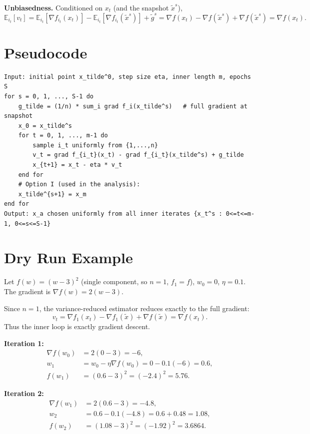 \documentclass[11pt]{article}
\begin{document}
\textbf{Unbiasedness.} Conditioned on $x_t$ (and the snapshot $\tilde{x}^s$),
\[
\mathbb{E}_{i_t}[v_t]
= \mathbb{E}_{i_t}[\nabla f_{i_t}(x_t)] - \mathbb{E}_{i_t}[\nabla f_{i_t}(\tilde{x}^s)] + \tilde{g}^s
= \nabla f(x_t) - \nabla f(\tilde{x}^s) + \nabla f(\tilde{x}^s) = \nabla f(x_t).
\]

\section*{Pseudocode}

\begin{verbatim}
Input: initial point x_tilde^0, step size eta, inner length m, epochs S
for s = 0, 1, ..., S-1 do
    g_tilde = (1/n) * sum_i grad f_i(x_tilde^s)   # full gradient at snapshot
    x_0 = x_tilde^s
    for t = 0, 1, ..., m-1 do
        sample i_t uniformly from {1,...,n}
        v_t = grad f_{i_t}(x_t) - grad f_{i_t}(x_tilde^s) + g_tilde
        x_{t+1} = x_t - eta * v_t
    end for
    # Option I (used in the analysis):
    x_tilde^{s+1} = x_m
end for
Output: x_a chosen uniformly from all inner iterates {x_t^s : 0<=t<=m-1, 0<=s<=S-1}
\end{verbatim}

\section*{Dry Run Example}

Let $f(w) = (w-3)^2$ (single component, so $n=1$, $f_1=f$),
$w_0 = 0$, $\eta = 0.1$. The gradient is $\nabla f(w) = 2(w-3)$.

Since $n=1$, the variance-reduced estimator reduces exactly to the full gradient:
\[
v_t = \nabla f_{1}(x_t) - \nabla f_{1}(\tilde{x}) + \nabla f(\tilde{x}) = \nabla f(x_t).
\]
Thus the inner loop is exactly gradient descent.

\textbf{Iteration 1:}
\begin{align*}
\nabla f(w_0) &= 2(0-3) = -6,\\
w_1 &= w_0 - \eta \nabla f(w_0) = 0 - 0.1(-6) = 0.6,\\
f(w_1) &= (0.6-3)^2 = ( -2.4)^2 = 5.76.
\end{align*}

\textbf{Iteration 2:}
\begin{align*}
\nabla f(w_1) &= 2(0.6-3) = -4.8,\\
w_2 &= 0.6 - 0.1(-4.8) = 0.6 + 0.48 = 1.08,\\
f(w_2) &= (1.08-3)^2 = (-1.92)^2 = 3.6864.
\end{align*}
\end{document}

